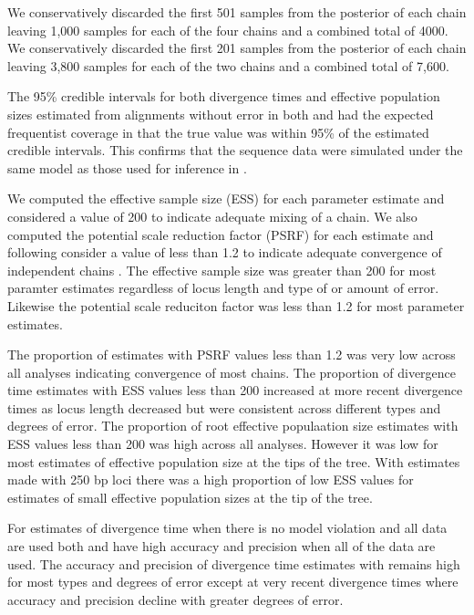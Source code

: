 

We conservatively discarded the first 501 samples from the posterior of each 
\ecoevolity chain leaving 1,000 samples for each of the four chains and a combined
total of 4000.
We conservatively discarded the first 201 samples from the posterior of each 
\beast chain leaving 3,800 samples for each of the two chains and a combined
total of 7,600.


The 95\% credible intervals for both divergence times and effective population 
sizes estimated from alignments without error in both \beast and \ecoevolity had 
the expected frequentist coverage in that the true value was within 95\% of the 
estimated credible intervals. This confirms that the sequence data were simulated
under the same model as those used for inference in \beast.


We computed the effective sample size (ESS) for each parameter estimate and considered
a value of 200 to indicate adequate mixing of a chain. 
We also computed the potential scale reduction factor (PSRF) for each estimate and following 
consider a value of less than 1.2 to indicate adequate 
convergence of independent chains \citep{gelman1998}. 
The effective sample size was greater than 200 for most \ecoevolity paramter estimates
regardless of locus length and type of or amount of error. 
Likewise the potential scale reduciton factor was less than 1.2 for most \ecoevolity parameter estimates.

The proportion of estimates with PSRF values less than 1.2 was very low across 
all \beast analyses indicating convergence of most chains.
The proportion of \beast divergence time estimates with ESS values less than 200 
increased at more recent divergence times as locus length decreased but were 
consistent across different types and degrees of error.
The proportion of \beast root effective populaation size estimates with ESS 
values less than 200 was high across all analyses. However it was low for most estimates
of effective population size at the tips of the tree. With estimates made with 250 
bp loci there was a high proportion of low ESS values for estimates of small 
effective population sizes at the tip of the tree.


For estimates of divergence time when there is no model violation and all data 
are used both \ecoevolity and \beast
have high accuracy and precision when all of the data are used. The accuracy and
precision of divergence time estimates with \ecoevolity remains high for most 
types and degrees of error except at very recent divergence times where accuracy
and precision decline with greater degrees of error.

